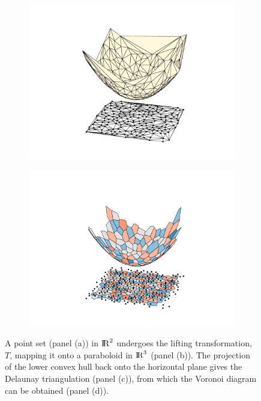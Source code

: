 \begin{figure}[bt]
       \begin{subfigure}[b]{0.4\textwidth}
         \centering
         \includegraphics[width=\textwidth]{./appendices/figures/power_3.pdf}
         \caption{}
         \label{appfig:vorconvexhull3}
     \end{subfigure}
     \hspace{1cm}
      \begin{subfigure}[b]{0.4\textwidth}
         \centering
         \includegraphics[width=\textwidth]{./appendices/figures/power_4.pdf}
         \caption{}
         \label{appfig:vorconvexhull4}
     \end{subfigure}

	\caption{A point set (panel (a)) in ${\rm I\!R}^2$ undergoes the lifting transformation, $T$, mapping it onto a paraboloid in ${\rm I\!R}^3$ (panel (b)). The projection of the lower convex hull back onto the horizontal plane gives the Delaunay triangulation (panel (c)), from which the Voronoi diagram can be obtained (panel (d)).}
	\label{appfig:vorconvexhull}
\end{figure}


